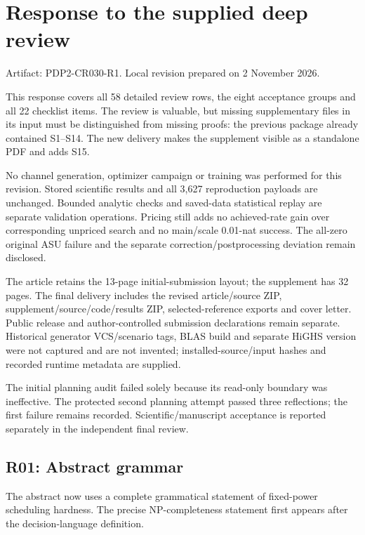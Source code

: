 \documentclass[10pt]{article}
\begin{document}
\section*{Response to the supplied deep review}

Artifact: PDP2-CR030-R1. Local revision prepared on 2 November 2026.

This response covers all 58 detailed review rows, the eight acceptance groups and all 22 checklist items. The review is valuable, but missing supplementary files in its input must be distinguished from missing proofs: the previous package already contained S1--S14. The new delivery makes the supplement visible as a standalone PDF and adds S15.

No channel generation, optimizer campaign or training was performed for this revision. Stored scientific results and all 3,627 reproduction payloads are unchanged. Bounded analytic checks and saved-data statistical replay are separate validation operations. Pricing still adds no achieved-rate gain over corresponding unpriced search and no main/\allowbreak scale 0.01-nat success. The all-zero original ASU failure and the separate correction/\allowbreak postprocessing deviation remain disclosed.

The article retains the 13-page initial-submission layout; the supplement has 32 pages. The final delivery includes the revised article/\allowbreak source ZIP, supplement/\allowbreak source/\allowbreak code/\allowbreak results ZIP, selected-reference exports and cover letter. Public release and author-controlled submission declarations remain separate. Historical generator VCS/\allowbreak scenario tags, BLAS build and separate HiGHS version were not captured and are not invented; installed-source/\allowbreak input hashes and recorded runtime metadata are supplied.

The initial planning audit failed solely because its read-only boundary was ineffective. The protected second planning attempt passed three reflections; the first failure remains recorded. Scientific/\allowbreak manuscript acceptance is reported separately in the independent final review.

\subsection*{R01: Abstract grammar}

The abstract now uses a complete grammatical statement of fixed-power scheduling hardness. The precise NP-completeness statement first appears after the decision-language definition.
\end{document}
